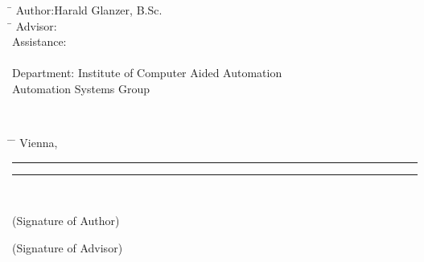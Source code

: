 \begin{center}
{\ \vspace{5cm}}

\begin{minipage}[t][2.8cm][s]{\textwidth}%
\centering
\thesistitlefonthuge\sffamily\bfseries\tuinfthesistitle\\
\bigskip
\bigskip
\bigskip
\bigskip
{\thesistitlefontHUGE\sffamily\bfseries\tuinfthesissubtitle\HUGE}
\\
~
\\
\end{minipage}

{\ \vspace{6cm}}

\vspace{0pt}\raggedright\sffamily\Large
\begin{minipage}[t][4cm][t]{\textwidth}%
  \begin{tabbing}%
	     \hspace{40mm} \= \hspace{66mm} \kill
	    Author:\>Harald Glanzer, B.Sc.\\  
	    \hspace{40mm} \= \hspace{66mm} \kill
	    Advisor:\> \tuinfthesisbetreins\\
	    Assistance: \> \tuinfthesisbetrzwei\\
	    \\
	    Department:\>  Institute of Computer Aided Automation\\
	    \>Automation Systems Group
     \end{tabbing}
\end{minipage}

{\ \vspace{4cm}}


\begin{minipage}[t][1.5cm][t]{\textwidth}%
  \vspace{0pt}\sffamily\thesistitlefontnormalsize
  \begin{tabbing}%
    \hspace{45mm} \= \hspace{63mm} \= \hspace{51mm} \kill
    Vienna, \tuinfthesisdate \> {\raggedright\rule{51mm}{0.5pt}} \> {\raggedright\rule{51mm}{0.5pt}} \\
    \> \begin{minipage}[t][0.5cm][t]{51mm}\centering (Signature of Author)\end{minipage}
    \> \begin{minipage}[t][0.5cm][t]{51mm}\centering (Signature of Advisor)\end{minipage}
    \end{tabbing}
\end{minipage}

\end{center}